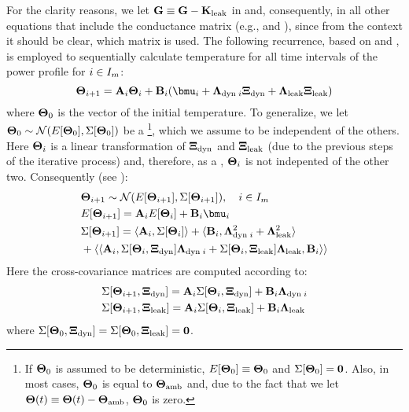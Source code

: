 For the clarity reasons, we let $\mathbf{G} \equiv \mathbf{G} - \mathbf{K}_{\text{leak}}$ in  and, consequently, in all other equations that include the conductance matrix (e.g.,  and ), since from the context it should be clear, which matrix is used. The following recurrence, based on  and , is employed to sequentially calculate temperature for all time intervals of the power profile for $i \in I_m$:
\begin{equation} \equlabel{tta-fourier-recurrence}
  \vtemp_{i + 1} = \m{A}_i \vtemp_i + \m{B}_i (\vmean{i} + \ddev{\dyn \; i} \vnormal_\dyn + \ddev{\leak} \vnormal_\leak)
\end{equation}
where $\mathbf{\Theta}_0$ is the vector of the initial temperature. To generalize, we let $\mathbf{\Theta}_0 \sim \mathcal{N}(E[\mathbf{\Theta}_0], \Sigma[\mathbf{\Theta}_0])$ be a \rv\footnote{If $\mathbf{\Theta}_0$ is assumed to be deterministic, $E[\mathbf{\Theta}_0] \equiv \mathbf{\Theta}_0$ and $\Sigma[\mathbf{\Theta}_0] = \mathbf{0}$. Also, in most cases, $\mathbf{\Theta}_0$ is equal to $\mathbf{\Theta}_{\text{amb}}$ and, due to the fact that we let $\mathbf{\Theta}(t) \equiv \mathbf{\Theta}(t) - \mathbf{\Theta}_{\text{amb}}$, $\mathbf{\Theta}_0$ is zero.}, which we assume to be independent of the others. Here $\mathbf{\Theta}_i$ is a linear transformation of $\mathbf{\Xi}_{\text{dyn}}$ and $\mathbf{\Xi}_{\text{leak}}$ (due to the previous steps of the iterative process) and, therefore, as a \rv, $\mathbf{\Theta}_i$ is not indepented of the other two. Consequently (see ):
\begin{align}
  & \vtemp_{i + 1} \sim \normal(\expect{\vtemp_{i + 1}}, \cov{\vtemp_{i + 1}}), \sep i \in \timeindex \equlabel{tta-process-variation-probabilistic-recurrence} \\
  & \expect{\vtemp_{i + 1}} = \m{A}_i \expect{\vtemp_i} + \m{B}_i \vmean{i} \nonumber \\
  & \cov{\vtemp_{i + 1}} = \dbl{\m{A}_i, \cov{\vtemp_i}} + \dbl{\m{B}_i , \ddev{\dyn \; i}^2 + \ddev{\leak}^2} \nonumber \\
  & {} + \ddbl{\m{A}_i, \cov{\vtemp_i, \vnormal_\dyn} \ddev{\dyn \; i} + \cov{\vtemp_i, \vnormal_\leak} \ddev{\leak}, \m{B}_i} \nonumber
\end{align}
Here the cross-covariance matrices are computed according to:
\begin{align}
  & \cov{\vtemp_{i+1}, \vnormal_\dyn} = \m{A}_i \cov{\vtemp_i, \vnormal_\dyn} + \m{B}_i \ddev{\dyn \; i} \equlabel{cross-covariance-dynamic} \\
  & \cov{\vtemp_{i+1}, \vnormal_\leak} = \m{A}_i \cov{\vtemp_i, \vnormal_\leak} + \m{B}_i \ddev{\leak} \equlabel{cross-covariance-leakage}
\end{align}
where $\Sigma[\mathbf{\Theta}_0, \mathbf{\Xi}_{\text{dyn}}] = \Sigma[\mathbf{\Theta}_0, \mathbf{\Xi}_{\text{leak}}] = \mathbf{0}$.

